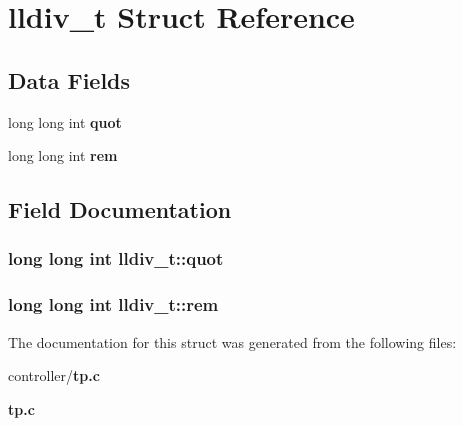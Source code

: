 \section{lldiv\_\-t Struct Reference}
\label{structlldiv__t}
\subsection*{Data Fields}
\begin{DoxyCompactItemize}
\item 
long long int {\bf quot}
\item 
long long int {\bf rem}
\end{DoxyCompactItemize}


\subsection{Field Documentation}
\subsubsection[{quot}]{\setlength{\rightskip}{0pt plus 5cm}long long int {\bf lldiv\_\-t::quot}}\label{structlldiv__t_aa2c189bf2a4ebe0f680463e4ce32b72f}
\subsubsection[{rem}]{\setlength{\rightskip}{0pt plus 5cm}long long int {\bf lldiv\_\-t::rem}}\label{structlldiv__t_adc99c61028a27673c373ab2815f90a79}


The documentation for this struct was generated from the following files:\begin{DoxyCompactItemize}
\item 
controller/{\bf tp.c}\item 
{\bf tp.c}\end{DoxyCompactItemize}

